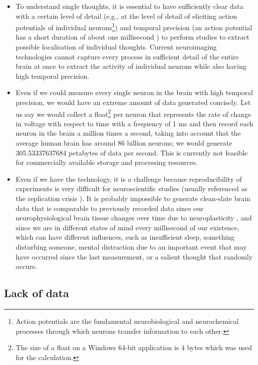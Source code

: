 \begin{itemize}
  \item To understand single thoughts, it is essential to have sufficiently clear data with a certain level of detail (e.g., at the level of detail of eliciting action potentials of individual neurons\footnote{Action potentials are the fundamental neurobiological and neurochemical processes through which neurons transfer information to each other.}) and temporal precision (an action potential has a short duration of about one millisecond \citep{byrne_resting_2021}) to perform studies to extract possible localisation of individual thoughts. Current neuroimaging technologies cannot capture every process in sufficient detail of the entire brain at once to extract the activity of individual neurons while also having high temporal precision.
  \item Even if we could measure every single neuron in the brain with high temporal precision, we would have an extreme amount of data generated concisely. Let us say we would collect a float\footnote{The size of a float on a Windows 64-bit application is 4 bytes which was used for the calculation.} per neuron that represents the rate of change in voltage with respect to time with a frequency of 1 ms and then record each neuron in the brain a million times a second, taking into account that the average human brain has around 86 billion neurons; we would generate 305.53337637684 petabytes of data per second. This is currently not feasible for commercially available storage and processing resources.
  \item Even if we have the technology, it is a challenge because reproducibility of experiments is very difficult for neuroscientific studies (usually referenced as the replication crisis \citep{maxwell_is_2015}). It is probably impossible to generate clean-slate brain data that is comparable to previously recorded data since our neurophysiological brain tissue changes over time due to neuroplasticity \citep{puderbaugh_neuroplasticity_2022}, and since we are in different states of mind every millisecond of our existence, which can have different influences, such as insufficient sleep, something disturbing someone, mental distraction due to an important event that may have occurred since the last measurement, or a salient thought that randomly occurs.
\end{itemize}

\subsection{Lack of data}
\label{chapter2-lack-of-data}

